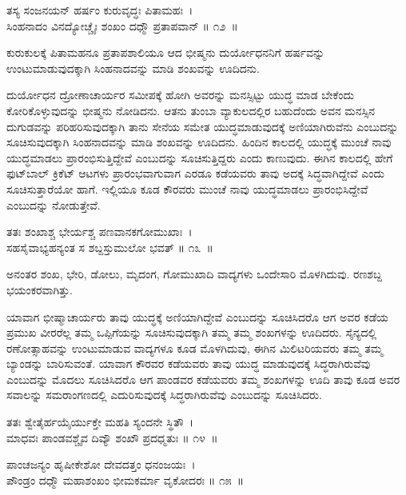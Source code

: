 \begin{shloka}
ತಸ್ಯ ಸಂಜನಯನ್ ಹರ್ಷಂ ಕುರುವೃದ್ಧಃ ಪಿತಾಮಹಃ~।\\ಸಿಂಹನಾದಂ ವಿನದ್ಯೋಚ್ಚೈಃ ಶಂಖಂ ದಧ್ಮೌ ಪ್ರತಾಪವಾನ್ \hfill॥ ೧೨~॥
\end{shloka}

\begin{artha}
ಕುರುಕುಲಕ್ಕೆ ಪಿತಾಮಹನೂ ಪ್ರತಾಪಶಾಲಿಯೂ ಆದ ಭೀಷ್ಮನು ದುರ್ಯೋಧನನಿಗೆ ಹರ್ಷವನ್ನು ಉಂಟುಮಾಡುವುದಕ್ಕಾಗಿ ಸಿಂಹನಾದವನ್ನು ಮಾಡಿ ಶಂಖವನ್ನು ಊದಿದನು.
\end{artha}

ದುರ್ಯೋಧನ ದ್ರೋಣಾಚಾರ್ಯರ ಸಮೀಪಕ್ಕೆ ಹೋಗಿ ಅವರನ್ನು ಮನಸ್ಸಿಟ್ಟು ಯುದ್ಧ ಮಾಡ ಬೇಕೆಂದು ಕೋರಿಕೊಳ್ಳುವುದನ್ನು ಭೀಷ್ಮನು ನೋಡಿದನು. ಆತನು ತುಂಬಾ ವ್ಯಾಕುಲದಲ್ಲಿರ ಬಹುದೆಂದು ಅವನ ಮನಸ್ಸಿನ ದುಗುಡವನ್ನು ಪರಿಹರಿಸುವುದಕ್ಕಾಗಿ ತಾನು ಸೇನೆಯ ಸಮೇತ ಯುದ್ಧಮಾಡುವುದಕ್ಕೆ ಅಣಿಯಾಗಿರುವೆನು ಎಂಬುದನ್ನು ಸೂಚಿಸುವುದಕ್ಕಾಗಿ ಸಿಂಹನಾದವನ್ನು ಮಾಡಿ ಶಂಖವನ್ನು ಊದಿದನು. ಹಿಂದಿನ ಕಾಲದಲ್ಲಿ ಯುದ್ಧಕ್ಕೆ ಮುಂಚೆ ನಾವು ಯುದ್ಧಮಾಡಲು ಪ್ರಾರಂಭಿಸುತ್ತಿದ್ದೇವೆ ಎಂಬುದನ್ನು ಸೂಚಿಸುತ್ತಿದ್ದರು ಎಂದು ಕಾಣುವುದು. ಈಗಿನ ಕಾಲದಲ್ಲಿ ಹೇಗೆ ಫುಟ್​ಬಾಲ್ ಕ್ರಿಕೆಟ್ ಆಟಗಳು ಪ್ರಾರಂಭವಾಗುವಾಗ ಎರಡೂ ಕಡೆಯವರು ತಾವು ಅದಕ್ಕೆ ಸಿದ್ಧವಾಗಿದ್ದೇವೆ ಎಂದು ಸೂಚಿಸುತ್ತಾರೆಯೋ ಹಾಗೆ. ಇಲ್ಲಿಯೂ ಕೂಡ ಕೌರವರು ಮುಂಚೆ ನಾವು ಯುದ್ಧಮಾಡಲು ಪ್ರಾರಂಭಿಸಿದ್ದೇವೆ ಎಂಬುದನ್ನು ನೋಡುತ್ತೇವೆ.

\begin{shloka}
ತತಃ ಶಂಖಾಶ್ಚ ಭೇರ್ಯಶ್ಚ ಪಣವಾನಕಗೋಮುಖಾಃ~।\\ಸಹಸೈವಾಭ್ಯಹನ್ಯಂತ ಸ ಶಬ್ದಸ್ತುಮುಲೋ ಭವತ್ \hfill॥ ೧೩~॥
\end{shloka}

\begin{artha}
ಅನಂತರ ಶಂಖ, ಭೇರಿ, ಡೋಲು, ಮೃದಂಗ, ಗೋಮುಖಾದಿ ವಾದ್ಯಗಳು ಒಂದೇಸಾರಿ ಮೊಳಗಿದುವು. ರಣಶಬ್ದ ಭಯಂಕರವಾಗಿತ್ತು.
\end{artha}

ಯಾವಾಗ ಭೀಷ್ಮಾಚಾರ್ಯರು ತಾವು ಯುದ್ಧಕ್ಕೆ ಅಣಿಯಾಗಿದ್ದೇವೆ ಎಂಬುದನ್ನು ಸೂಚಿಸಿ\-ದರೊ ಆಗ ಅವರ ಕಡೆಯ ಪ್ರಮುಖ ವೀರರೆಲ್ಲ ತಮ್ಮ ಒಪ್ಪಿಗೆಯನ್ನು ಸೂಚಿಸುವುದಕ್ಕಾಗಿ ತಮ್ಮ ತಮ್ಮ ಶಂಖಗಳನ್ನು ಊದಿದರು. ಸೈನ್ಯದಲ್ಲಿ ರಣೋತ್ಸಾಹವನ್ನು ಉಂಟುಮಾಡುವ ವಾದ್ಯಗಳೂ ಕೂಡ ಮೊಳಗಿದುವು, ಈಗಿನ ಮಿಲಿಟರಿಯವರು ತಮ್ಮ ತಮ್ಮ ಬ್ಯಾಂಡನ್ನು ಬಾರಿಸುವಂತೆ. ಯಾವಾಗ ಕೌರವರ ಕಡೆಯವರು ತಾವು ಯುದ್ಧ ಮಾಡುವುದಕ್ಕೆ ಸಿದ್ಧರಾಗಿರುವೆವು ಎಂಬುದನ್ನು ಮೊದಲು ಸೂಚಿಸಿದರೊ ಆಗ ಪಾಂಡವರ ಕಡೆಯವರು ತಮ್ಮ ಶಂಖಗಳನ್ನು ಊದಿ ತಾವು ಕೂಡ ಅವರ ಸವಾಲನ್ನು ಸಮರಾಂಗಣದಲ್ಲಿ ಎದುರಿಸುವುದಕ್ಕೆ ಸಿದ್ಧರಾಗಿರುವೆವು ಎಂಬುದನ್ನು ಸೂಚಿಸಿದರು.

\begin{shloka}
ತತಃ ಶ್ವೇತೈರ್ಹಯೈರ್ಯುಕ್ತೇ ಮಹತಿ ಸ್ಯಂದನೇ ಸ್ಥಿತೌ~।\\ಮಾಧವಃ ಪಾಂಡವಶ್ಚೈವ ದಿವ್ಯೌ ಶಂಖೌ ಪ್ರದಧ್ಮತುಃ \hfill॥ ೧೪~॥
\end{shloka}

\begin{shloka}
ಪಾಂಚಜನ್ಯಂ ಹೃಷೀಕೇಶೋ ದೇವದತ್ತಂ ಧನಂಜಯಃ~।\\ಪೌಂಡ್ರಂ ದಧ್ಮೌ ಮಹಾಶಂಖಂ ಭೀಮಕರ್ಮಾ ವೃಕೋದರಃ \hfill॥ ೧೫~॥
\end{shloka}


